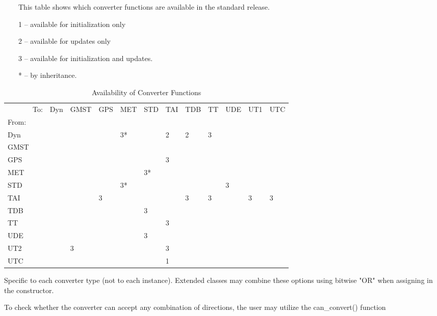 {\begin{enumerate}
\begin{table}[h]
   \caption{Availability of Converter Functions}
\vspace{0.25in}
\ \ \ \ This table shows which converter functions are available in the
standard release.

\ \ \ \ 1 -- available for initialization only

\ \ \ \ 2 -- available for updates only

\ \ \ \ 3 -- available for initialization and updates.

\ \ \ \ * -- by inheritance.
\vspace{0.25in}


   \centering
   \label{tab:ConverterFunctions}
      \begin{tabular}{||l|l|l|l|l|l|l|l|l|l|l|l||} \hline
   \ \ \ \ \ \ \ To: &Dyn &GMST &GPS &MET &STD &TAI &TDB &TT &UDE &UT1 &UTC\\
From: &~ &~ &~ &~ &~ &~ &~ &~ &~ &~ &~\\ \hline
Dyn &~ &~ &~ & 3* &~ & 2 & 2 & 3 &~ &~\\\hline
GMST &~ &~ &~ &~ &~ &~ &~ &~ &~ &~ &~\\\hline
GPS &~ &~ &~ &~ &~ & 3 &~ &~ &~ &~ &~\\\hline
MET &~ &~ &~ &~ & 3* &~ &~ &~ &~ &~ &~\\\hline
STD &~ &~ &~ & 3* &~ &~ &~ &~ & 3 &~ &~\\\hline
TAI &~ &~ & 3 &~ &~ &~ & 3 & 3 &~ & 3 & 3 \\\hline
TDB &~ &~ &~ &~ & 3 &~ &~ &~ &~ &~\\\hline
TT &~ &~ &~ &~ &~ & 3 &~ &~ &~ &~ &~\\\hline
UDE &~ &~ &~ &~ & 3 &~ &~ &~ &~ &~ &~\\\hline
UT2 &~ & 3 &~ &~ &~ & 3 &~ &~ &~ &~ &~\\\hline
UTC &~ &~ &~ &~ &~ & 1 &~ &~ &~ &~ &~\\\hline

   \end{tabular}




\end{table}

{\begin{enumerate}

Specific to each converter type (not to each instance). Extended classes may
combine these options using bitwise "OR" when assigning in the constructor.

To check whether the converter can accept any combination of directions, the
user may utilize the can\_convert() function


\end{enumerate}}
\end{enumerate}}
